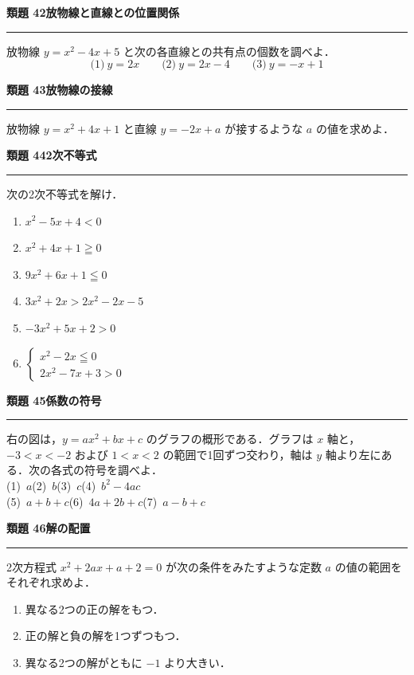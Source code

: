 \documentclass[a4paper,11pt]{ltjsarticle}
\newcommand{\mon}[2]{\Needspace{7\baselineskip}\vspace{10pt}%
  {\sffamily\bfseries 類題 #1\quad #2\par}\vspace{2pt}\hrule\vspace{4pt}}
\begin{document}
\mon{42}{放物線と直線との位置関係}
放物線 $y=x^2-4x+5$ と次の各直線との共有点の個数を調べよ．
\[\text{(1)}\ y=2x\qquad\text{(2)}\ y=2x-4\qquad\text{(3)}\ y=-x+1\]

\mon{43}{放物線の接線}
放物線 $y=x^2+4x+1$ と直線 $y=-2x+a$ が接するような $a$ の値を求めよ．

\mon{44}{2次不等式}
次の2次不等式を解け．
\begin{multicols}{2}
\begin{enumerate}
\item $x^2-5x+4<0$
\item $x^2+4x+1\geqq0$
\item $9x^2+6x+1\leqq0$
\item $3x^2+2x>2x^2-2x-5$
\item $-3x^2+5x+2>0$
\item $\begin{cases}x^2-2x\leqq0\\ 2x^2-7x+3>0\end{cases}$
\end{enumerate}
\end{multicols}

\mon{45}{係数の符号}
\begin{minipage}[t]{0.62\linewidth}
右の図は，$y=ax^2+bx+c$ のグラフの概形である．グラフは $x$ 軸と，$-3<x<-2$ および $1<x<2$ の範囲で1回ずつ交わり，軸は $y$ 軸より左にある．次の各式の符号を調べよ．\\[2pt]
(1)\ $a$\qquad (2)\ $b$\qquad (3)\ $c$\qquad (4)\ $b^2-4ac$\\
(5)\ $a+b+c$\qquad (6)\ $4a+2b+c$\qquad (7)\ $a-b+c$
\end{minipage}\hfill
\begin{minipage}[t]{0.34\linewidth}
\vspace{-8pt}
\end{minipage}

\mon{46}{解の配置}
2次方程式 $x^2+2ax+a+2=0$ が次の条件をみたすような定数 $a$ の値の範囲をそれぞれ求めよ．
\begin{enumerate}
\item 異なる2つの正の解をもつ．
\item 正の解と負の解を1つずつもつ．
\item 異なる2つの解がともに $-1$ より大きい．
\end{enumerate}
\end{document}
